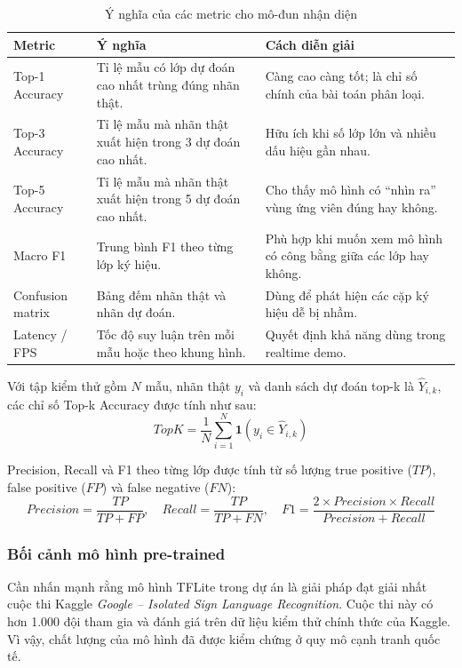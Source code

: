 \begin{table}[H]
\centering
\caption{Ý nghĩa của các metric cho mô-đun nhận diện}
\label{tab:recognition-metric-meanings}
\begin{tabularx}{\textwidth}{|p{3cm}|X|X|}
\hline
\textbf{Metric} & \textbf{Ý nghĩa} & \textbf{Cách diễn giải} \\
\hline
Top-1 Accuracy & Tỉ lệ mẫu có lớp dự đoán cao nhất trùng đúng nhãn thật. & Càng cao càng tốt; là chỉ số chính của bài toán phân loại. \\
\hline
Top-3 Accuracy & Tỉ lệ mẫu mà nhãn thật xuất hiện trong 3 dự đoán cao nhất. & Hữu ích khi số lớp lớn và nhiều dấu hiệu gần nhau. \\
\hline
Top-5 Accuracy & Tỉ lệ mẫu mà nhãn thật xuất hiện trong 5 dự đoán cao nhất. & Cho thấy mô hình có ``nhìn ra'' vùng ứng viên đúng hay không. \\
\hline
Macro F1 & Trung bình F1 theo từng lớp ký hiệu. & Phù hợp khi muốn xem mô hình có công bằng giữa các lớp hay không. \\
\hline
Confusion matrix & Bảng đếm nhãn thật và nhãn dự đoán. & Dùng để phát hiện các cặp ký hiệu dễ bị nhầm. \\
\hline
Latency / FPS & Tốc độ suy luận trên mỗi mẫu hoặc theo khung hình. & Quyết định khả năng dùng trong realtime demo. \\
\hline
\end{tabularx}
\end{table}

Với tập kiểm thử gồm $N$ mẫu, nhãn thật $y_i$ và danh sách dự đoán top-k là $\hat{Y}_{i,k}$, các chỉ số
Top-k Accuracy được tính như sau:
\[
    TopK = \frac{1}{N}\sum_{i=1}^{N}\mathbf{1}(y_i \in \hat{Y}_{i,k})
\]

Precision, Recall và F1 theo từng lớp được tính từ số lượng true positive ($TP$), false positive ($FP$)
và false negative ($FN$):
\[
    Precision = \frac{TP}{TP + FP}, \quad
    Recall = \frac{TP}{TP + FN}, \quad
    F1 = \frac{2 \times Precision \times Recall}{Precision + Recall}
\]

\subsubsection{Bối cảnh mô hình pre-trained}

Cần nhấn mạnh rằng mô hình TFLite trong dự án là giải pháp đạt giải nhất cuộc thi Kaggle
\textit{Google -- Isolated Sign Language Recognition}. Cuộc thi này có hơn 1.000 đội tham gia
và đánh giá trên dữ liệu kiểm thử chính thức của Kaggle. Vì vậy, chất lượng của mô hình đã được
kiểm chứng ở quy mô cạnh tranh quốc tế.


